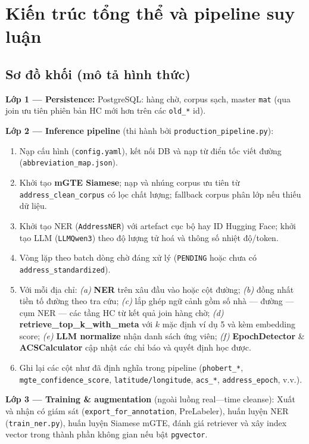 \section{Kiến trúc tổng thể và pipeline suy luận}
\subsection{Sơ đồ khối (mô tả hình thức)}
\textbf{Lớp 1 --- Persistence:} PostgreSQL: hàng chờ, corpus sạch, master \texttt{mat} (qua join ưu tiên phiên bản HC mới hơn trên các \texttt{old\_*} id).

\textbf{Lớp 2 --- Inference pipeline} (thi hành bởi \texttt{production\_pipeline.py}):
\begin{enumerate}
  \item Nạp cấu hình (\texttt{config.yaml}), kết nối DB và nạp từ điển tốc viết đường (\texttt{abbreviation\_map.json}).
  \item Khởi tạo \textbf{mGTE Siamese}; nạp và nhúng corpus ưu tiên từ \texttt{address\_clean\_corpus} có lọc chất lượng; fallback corpus phân lớp nếu thiếu dữ liệu.
  \item Khởi tạo NER (\texttt{AddressNER}) với artefact cục bộ hay ID Hugging Face; khởi tạo LLM (\texttt{LLMQwen3}) theo độ lượng tử hoá và thông số nhiệt độ/token.
  \item Vòng lặp theo batch dòng chờ đáng xử lý (\texttt{PENDING} hoặc chưa có \texttt{address\_standardized}).
  \item Với mỗi địa chỉ: \emph{(a)} \textbf{NER} trên xâu đầu vào hoặc cột đường; \emph{(b)} đồng nhất tiền tố đường theo tra cứu; \emph{(c)} lắp ghép ngữ cảnh gồm số nhà --- đường --- cụm NER --- các tầng HC từ kết quả join hàng chờ; \emph{(d)} \textbf{retrieve\_top\_k\_with\_meta} với \(k\) mặc định ví dụ 5 và kèm embedding score; \emph{(e)} \textbf{LLM normalize} nhận danh sách ứng viên; \emph{(f)} \textbf{EpochDetector} \& \textbf{ACSCalculator} cập nhật các chỉ báo và quyết định học được.
  \item Ghi lại các cột như đã định nghĩa trong pipeline (\texttt{phobert\_*}, \texttt{mgte\_confidence\_score}, \texttt{latitude/longitude}, \texttt{acs\_*}, \texttt{address\_epoch}, v.v.).
\end{enumerate}

\textbf{Lớp 3 --- Training \& augmentation} (ngoài luồng real---time cleanse): Xuất và nhận có giám sát (\texttt{export\_for\_annotation}, PreLabeler), huấn luyện NER (\texttt{train\_ner.py}), huấn luyện Siamese mGTE, đánh giá retriever và xây index vector trong thành phần không gian nếu bật \texttt{pgvector}.

